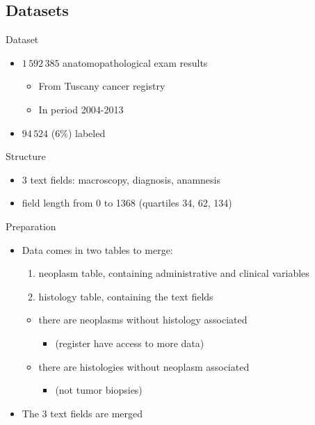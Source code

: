 \subsection{Datasets}
\begin{frame}{Dataset}
  \begin{itemize}
  \item \alert{$1\,592\,385$} anatomopathological exam results
    \begin{itemize}
    \item From \alert{Tuscany} cancer registry
    \item In period \alert{2004-2013}
    \end{itemize}
  \item \alert{$94\,524$} ($6\%$) labeled
  \end{itemize}
  \begin{block}{Structure}
    \begin{itemize}
    \item 3 text \alert{fields}: macroscopy, diagnosis, anamnesis
    \item field \alert{length} from 0 to 1368 (quartiles 34, 62, 134)
    \end{itemize}
  \end{block}
\end{frame}

\begin{frame}{Preparation}
  \begin{itemize}
  \item Data comes in \alert{two} tables to merge:
    \begin{enumerate}
    \item neoplasm table, containing administrative and clinical variables
    \item histology table, containing the text fields
    \end{enumerate}
    \begin{itemize}
    \item there are neoplasms without histology associated
      \begin{itemize}
      \item (register have access to more data)
      \end{itemize}
    \item there are histologies without neoplasm associated
      \begin{itemize}
      \item (not tumor biopsies) 
      \end{itemize}
    \end{itemize}
  \item The 3 text fields are \alert{merged}
  \end{itemize}
\end{frame}

